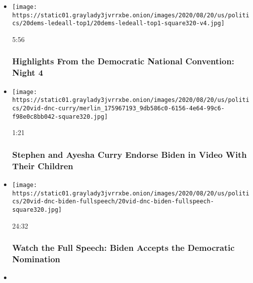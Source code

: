 \begin{itemize}
\item
  \href{https://www.nytimes3xbfgragh.onion/video/us/politics/100000007299516/democratic-national-convention-highlights.html?action=click\&module=video-series-bar\&region=header\&pgtype=Article\&playlistId=video/2020-Elections}{}

  \texttt{[image: https://static01.graylady3jvrrxbe.onion/images/2020/08/20/us/politics/20dems-ledeall-top1/20dems-ledeall-top1-square320-v4.jpg]}

  5:56

  \hypertarget{highlights-from-the-democratic-national-convention-night-4}{%
  \subsubsection{Highlights From the Democratic National Convention:
  Night
  4}\label{highlights-from-the-democratic-national-convention-night-4}}
\item
  \href{https://www.nytimes3xbfgragh.onion/video/us/elections/100000007299782/stephen-curry-speaks-dnc.html?action=click\&module=video-series-bar\&region=header\&pgtype=Article\&playlistId=video/2020-Elections}{}

  \texttt{[image: https://static01.graylady3jvrrxbe.onion/images/2020/08/20/us/politics/20vid-dnc-curry/merlin\_175967193\_9db586c0-6156-4e64-99c6-f98e0c8bb042-square320.jpg]}

  1:21

  \hypertarget{stephen-and-ayesha-curry-endorse-biden-in-video-with-their-children}{%
  \subsubsection{Stephen and Ayesha Curry Endorse Biden in Video With
  Their
  Children}\label{stephen-and-ayesha-curry-endorse-biden-in-video-with-their-children}}
\item
  \href{https://www.nytimes3xbfgragh.onion/video/us/elections/100000007299879/joe-biden-full-speech.html?action=click\&module=video-series-bar\&region=header\&pgtype=Article\&playlistId=video/2020-Elections}{}

  \texttt{[image: https://static01.graylady3jvrrxbe.onion/images/2020/08/20/us/politics/20vid-dnc-biden-fullspeech/20vid-dnc-biden-fullspeech-square320.jpg]}

  24:32

  \hypertarget{watch-the-full-speech-biden-accepts-the-democratic-nomination}{%
  \subsubsection{Watch the Full Speech: Biden Accepts the Democratic
  Nomination}\label{watch-the-full-speech-biden-accepts-the-democratic-nomination}}
\item
  \href{https://www.nytimes3xbfgragh.onion/video/us/elections/100000007299747/michael-bloomberg-speaks-dnc.html?action=click\&module=video-series-bar\&region=header\&pgtype=Article\&playlistId=video/2020-Elections}{}


\end{itemize}
